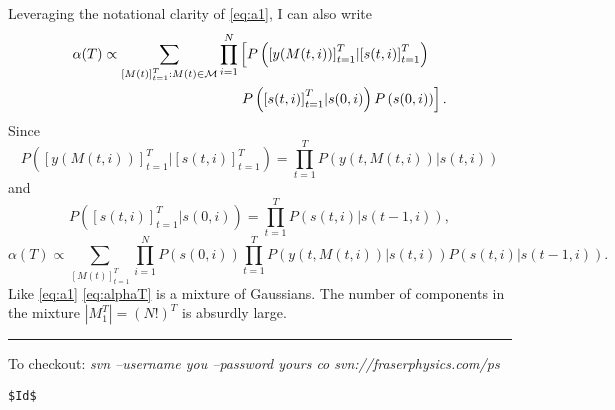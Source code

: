\documentclass[12pt]{article}
\newcommand{\M}{{\cal M}}
\newcommand{\os}[4]{{\left[ #1(#2) \right]}_{#3}^{#4}} %
\newcommand{\ti}[2]{{#1}{(#2)}}                         %
\newcommand{\ts}[4]{{#1}_{#3}^{#4}} %
\begin{document}
Leveraging the notational clarity of \eqref{eq:a1}, I can also write
\begin{align*}
  \ti{\alpha}{T} \propto \sum_{\os{M}{t}{t=1}{T}:\ti{M}{t}\in \M}
  \prod_{i=1}^N& \left[
  P\left( \os{y}{\ti{M}{t,i}}{t=1}{T} | \os{s}{t,i}{t=1}{T}\right) \right. \\
  & \left. P\left( \os{s}{t,i}{t=1}{T}| \ti{s}{0,i} \right)
  P\left( \ti{s}{0,i} \right) \right] .
\end{align*}
Since
\begin{equation*}
  P\left( \os{y}{\ti{M}{t,i}}{t=1}{T} | \os{s}{t,i}{t=1}{T}\right) =
  \prod_{t=1}^T P\left( \ti{y}{t,\ti{M}{t,i}} | \ti{s}{t,i}\right)
\end{equation*}
and
\begin{equation*}
  P\left( \os{s}{t,i}{t=1}{T}| \ti{s}{0,i} \right) = \prod_{t=1}^T
  P\left( \ti{s}{t,i} | \ti{s}{t-1,i}\right),
\end{equation*}
\begin{equation}
  \label{eq:alphaT}
  \ti{\alpha}{T} \propto \sum_{\os{M}{t}{t=1}{T}}
  \prod_{i=1}^N  P\left( \ti{s}{0,i} \right) \prod_{t=1}^T
  P\left( \ti{y}{t,\ti{M}{t,i}} | \ti{s}{t,i}\right)
  P\left( \ti{s}{t,i} | \ti{s}{t-1,i}\right).
\end{equation}
Like \eqref{eq:a1} \eqref{eq:alphaT} is a mixture of Gaussians.  The
number of components in the mixture $\left| \ts{M}{t}{1}{T}\right| =
(N!)^T$ is absurdly large.

\vfill \hrule To checkout: \emph{ svn --username you --password yours
  co svn://fraserphysics.com/ps}
\begin{verbatim}
$Id$
\end{verbatim}
\end{document}
